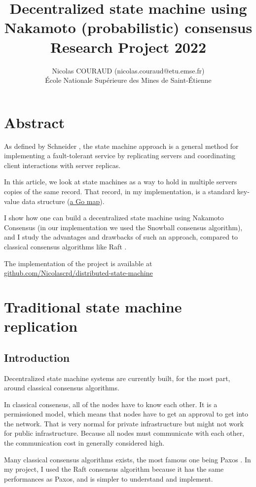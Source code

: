 \documentclass[11pt, twocolumn]{article}
\title{Decentralized state machine using Nakamoto (probabilistic) consensus\\\medskip Research Project 2022}
\author{Nicolas COURAUD (nicolas.couraud@etu.emse.fr)\\École Nationale Supérieure des Mines de Saint-Étienne}
\begin{document}
\maketitle
\onecolumn
\section*{Abstract}

As defined by Schneider \cite{stateMachine}, the state machine approach is a general method for implementing a fault-tolerant service
by replicating servers and coordinating client interactions with server replicas.

In this article, we look at state machines as a way to hold in multiple servers copies of the same record. That record, in my implementation, is a standard 
key-value data structure (\href{https://go.dev/blog/maps}{a Go map}).

I show how one can build a decentralized state machine using Nakamoto Consensus (in our implementation we used the Snowball consensus algorithm), and I study the advantages 
and drawbacks of such an approach, compared to classical consensus algorithms like Raft \cite{understandable}.

The implementation of the project is available at \href{https://github.com/Nicolascrd/distributed-state-machine}{github.com/Nicolascrd/distributed-state-machine}


\tableofcontents
\section{Traditional state machine replication}

\subsection{Introduction}

Decentralized state machine systems are currently built, for the most part, around classical consensus algorithms.

In classical consensus, all of the nodes have to know each other. It is a permissioned model, which means that nodes have to get an approval to get into the network. 
That is very normal for private infrastructure but might not work for public infrastructure. Because all nodes must communicate with each other, the communication cost in generally considered high.

Many classical consensus algorithms exists, the most famous one being Paxos \cite{parliament}. In my project, I used the Raft consensus algorithm \cite{understandable} because it has the same performances
as Paxos, and is simpler to understand and implement. 
\end{document}
